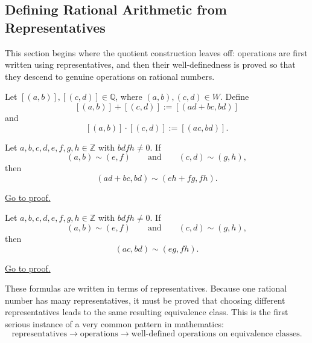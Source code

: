 
\subsection{Defining Rational Arithmetic from Representatives}
\label{sec:rational-arithmetic-from-representatives}

\begin{exposition}
This section begins where the quotient construction leaves off: operations are first written using representatives, and then their well-definedness is proved so that they descend to genuine operations on rational numbers.
\end{exposition}

\begin{definition}
\label{def:rational-operations}

Let $[(a,b)],[(c,d)]\in\mathbb{Q}$, where $(a,b),(c,d)\in W$.  Define
\[
[(a,b)] + [(c,d)] := [(ad+bc,bd)]
\]
and
\[
[(a,b)]\cdot[(c,d)] := [(ac,bd)].
\]

\end{definition}

\begin{lemma}
\label{lem:rational-addition-well-defined}
Let $a,b,c,d,e,f,g,h\in\mathbb{Z}$ with $bdfh\neq 0$. If
\[
(a,b)\sim(e,f)
\qquad\text{and}\qquad
(c,d)\sim(g,h),
\]
then
\[
(ad+bc,bd)\sim(eh+fg,fh).
\]
\end{lemma}

\begin{remark*}[Proof]
\hyperref[prf:rational-addition-well-defined]{Go to proof.}
\end{remark*}

\begin{lemma}
\label{lem:rational-multiplication-well-defined}
Let $a,b,c,d,e,f,g,h\in\mathbb{Z}$ with $bdfh\neq 0$. If
\[
(a,b)\sim(e,f)
\qquad\text{and}\qquad
(c,d)\sim(g,h),
\]
then
\[
(ac,bd)\sim(eg,fh).
\]
\end{lemma}

\begin{remark*}[Proof]
\hyperref[prf:rational-multiplication-well-defined]{Go to proof.}
\end{remark*}

\begin{remark*}
\label{rem:well-definedness-matters}

These formulas are written in terms of representatives.  Because one rational number has many
representatives, it must be proved that choosing different representatives leads to the same
resulting equivalence class.  This is the first serious instance of a very common pattern in
mathematics:
\[
\text{representatives}
\longrightarrow
\text{operations}
\longrightarrow
\text{well-defined operations on equivalence classes}.
\]

\end{remark*}

